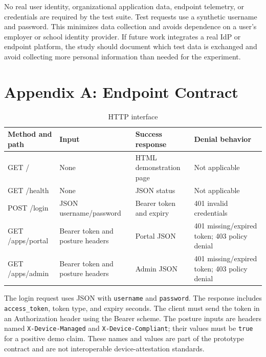 No real user identity, organizational application data, endpoint telemetry, or credentials are required by the test suite. Test requests use a synthetic username and password. This minimizes data collection and avoids dependence on a user's employer or school identity provider. If future work integrates a real IdP or endpoint platform, the study should document which test data is exchanged and avoid collecting more personal information than needed for the experiment.

\appendices
\section{Appendix A: Endpoint Contract}
\begin{table}[t]
\caption{HTTP interface}
\centering
\begin{tabular}{llll}
\toprule
Method and path & Input & Success response & Denial behavior\\
\midrule
GET / & None & HTML demonstration page & Not applicable\\
GET /health & None & JSON status & Not applicable\\
POST /login & JSON username/password & Bearer token and expiry & 401 invalid credentials\\
GET /apps/portal & Bearer token and posture headers & Portal JSON & 401 missing/expired token; 403 policy denial\\
GET /apps/admin & Bearer token and posture headers & Admin JSON & 401 missing/expired token; 403 policy denial\\
\bottomrule
\end{tabular}
\end{table}

The login request uses JSON with \texttt{username} and \texttt{password}. The response includes \texttt{access\_token}, token type, and expiry seconds. The client must send the token in an Authorization header using the Bearer scheme. The posture inputs are headers named \texttt{X-Device-Managed} and \texttt{X-Device-Compliant}; their values must be \texttt{true} for a positive demo claim. These names and values are part of the prototype contract and are not interoperable device-attestation standards.

